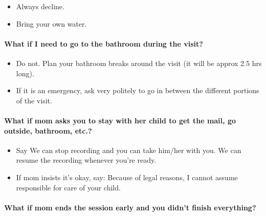 \documentclass[
  12pt,
]{book}
\providecommand{\tightlist}{%
  \setlength{\itemsep}{0pt}\setlength{\parskip}{0pt}}
\begin{document}
\begin{itemize}
\tightlist
\item
  Always decline.
\item
  Bring your own water.
\end{itemize}

\hypertarget{what-if-i-need-to-go-to-the-bathroom-during-the-visit}{%
\paragraph*{What if I need to go to the bathroom during the visit?}\label{what-if-i-need-to-go-to-the-bathroom-during-the-visit}}

\begin{itemize}
\tightlist
\item
  Do not. Plan your bathroom breaks around the visit (it will be approx 2.5 hrs long).
\item
  If it is an emergency, ask very politely to go in between the different portions of the visit.
\end{itemize}

\hypertarget{what-if-mom-asks-you-to-stay-with-her-child-to-get-the-mail-go-outside-bathroom-etc.}{%
\paragraph*{What if mom asks you to stay with her child to get the mail, go outside, bathroom, etc.?}\label{what-if-mom-asks-you-to-stay-with-her-child-to-get-the-mail-go-outside-bathroom-etc.}}

\begin{itemize}
\tightlist
\item
  Say We can stop recording and you can take him/her with you. We can resume the recording whenever you're ready.
\item
  If mom insists it's okay, say: Because of legal reasons, I cannot assume responsible for care of your child.
\end{itemize}

\hypertarget{what-if-mom-ends-the-session-early-and-you-didnt-finish-everything}{%
\paragraph*{What if mom ends the session early and you didn't finish everything?}\label{what-if-mom-ends-the-session-early-and-you-didnt-finish-everything}}
\end{document}
